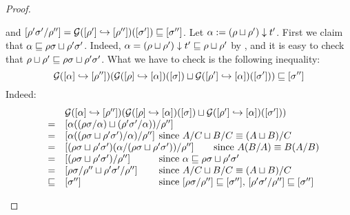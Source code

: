 \begin{proof}
\begin{enumerate}
\begin{enumerate}
\begin{enumerate}
     and
     ${[\rho'\sigma'/\rho'']} = \mathcal{G}({[\rho']} \hookrightarrow {[\rho'']})({[\sigma']}) \sqsubseteq {[\sigma'']}$.
      Let $\alpha := (\rho \sqcup \rho') \downarrow t'$.
      First we claim that $\alpha \sqsubseteq \rho\sigma \sqcup \rho'\sigma'$.
      Indeed, $\alpha = (\rho \sqcup \rho') \downarrow t' \sqsubseteq \rho \sqcup \rho'$
      by , and it is easy to check that
      $\rho \sqcup \rho' \sqsubseteq \rho\sigma \sqcup \rho'\sigma'$.
      What we have to check is the following inequality:
      \[
        \mathcal{G}({[\alpha]} \hookrightarrow {[\rho'']})(
          \mathcal{G}({[\rho]} \hookrightarrow {[\alpha]})({[\sigma]})
          \sqcup
          \mathcal{G}({[\rho']} \hookrightarrow {[\alpha]})({[\sigma']})
        )
        \sqsubseteq
        {[\sigma'']}
      \]
      Indeed:
      \[
        \begin{array}{rcll}
        &&
        \ulbG(\pt{\cls{\redseq''}}{\cls{\alpha}})(
          \ulbG(\pt{\cls{\alpha}}{\cls{\redseq}})(\cls{\redseqtwo})
          \sqcup
          \ulbG(\pt{\cls{\alpha}}{\cls{\redseq'}})(\cls{\redseqtwo'})
        ) \\
        & = &
        \cls{\alpha((\redseq\redseqtwo/\alpha) \sqcup (\redseq'\redseqtwo'/\alpha))/\redseq''}
        \\
        & = &
        \cls{\alpha((\redseq\redseqtwo \sqcup \redseq'\redseqtwo')/\alpha)/\redseq''}
        &\hspace{-5cm} \text{since $A/C \sqcup B/C \permeq (A \sqcup B)/C$}
        \\
        & = &
        \cls{(\redseq\redseqtwo \sqcup \redseq'\redseqtwo')(\alpha/(\redseq\redseqtwo \sqcup \redseq'\redseqtwo'))/\redseq''}
        &\hspace{-3cm} \text{since $A(B/A) \permeq B(A/B)$}
        \\
        & = &
        \cls{(\redseq\redseqtwo \sqcup \redseq'\redseqtwo')/\redseq''}
        &\hspace{-5cm} \text{since $\alpha \permle \redseq\redseqtwo \sqcup \redseq'\redseqtwo'$}
        \\
        & = &
        \cls{\redseq\redseqtwo/\redseq'' \sqcup \redseq'\redseqtwo'/\redseq''}
        &\hspace{-5cm} \text{since $A/C \sqcup B/C \permeq (A \sqcup B)/C$}
        \\
        & \permle &
        \cls{\redseqtwo''}
        &\hspace{-5cm} \text{since $\cls{\redseq\redseqtwo/\redseq''} \permle \cls{\redseqtwo''}$, $\cls{\redseq'\redseqtwo'/\redseq''} \permle \cls{\redseqtwo''}$}
        \end{array}
      \]
    \end{enumerate}
  \end{enumerate}


\end{enumerate}
\end{proof}
